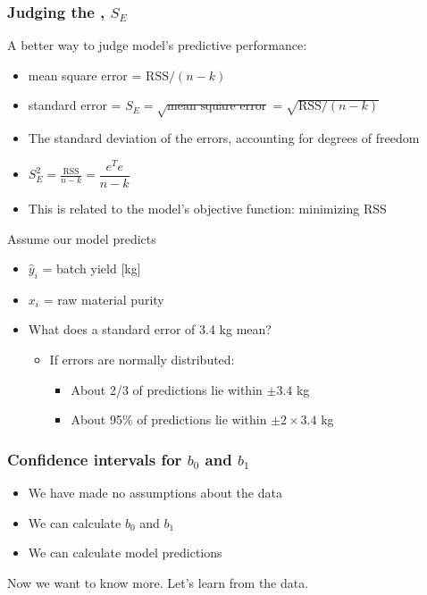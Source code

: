 \begin{frame}\frametitle{Judging the {\color{purple}{standard error}}, $S_E$}

	A better way to judge model's predictive performance:
	\begin{itemize}
		\item	mean square error = $\text{RSS}/(n-k)$
		\item	standard error = $S_E = \sqrt{\text{mean square error}} = \sqrt{\text{RSS}/(n-k)}$
		\item	The standard deviation of the errors, accounting for degrees of freedom
		\item	$S_E^2 = \frac{\displaystyle \text{RSS}}{\displaystyle n-k} = \dfrac{e^Te}{\displaystyle n-k}$
		\item	This is related to the model's objective function: minimizing RSS
	\end{itemize}

	Assume our model predicts
	\begin{itemize}
		\item	$\hat{y}_i$ = batch yield [kg]
		\item	$x_i$ = raw material purity
		\item	What does a standard error of 3.4 kg mean?
		\begin{itemize}
			\item	If errors are normally distributed:
			\begin{itemize}
				\item	About 2/3 of predictions lie within $\pm 3.4$ kg
				\item	About 95\% of predictions lie within $\pm 2 \times 3.4$ kg
			\end{itemize}
		\end{itemize}
	\end{itemize}
\end{frame}

\begin{frame}\frametitle{Confidence intervals for $b_0$ and $b_1$}
	\begin{itemize}
		\item	We have made no assumptions about the data
		\item	We can calculate $b_0$ and $b_1$
		\item	We can calculate model predictions
	\end{itemize}
	
	
	\vspace{12pt}
	Now we want to know more. Let's learn from the data.
\end{frame}

